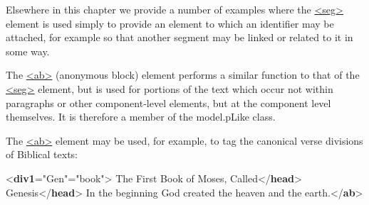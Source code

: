 Elsewhere in this chapter we provide a number of examples where the \hyperref[TEI.seg]{<seg>} element is used simply to provide an element to which an identifier may be attached, for example so that another segment may be linked or related to it in some way.\par
The \hyperref[TEI.ab]{<ab>} (anonymous block) element performs a similar function to that of the \hyperref[TEI.seg]{<seg>} element, but is used for portions of the text which occur not within paragraphs or other component-level elements, but at the component level themselves. It is therefore a member of the \textsf{model.pLike} class.\par
The \hyperref[TEI.ab]{<ab>} element may be used, for example, to tag the canonical verse divisions of Biblical texts: \par\bgroup{}\exampleFont \begin{shaded}\noindent\mbox{}{<\textbf{div1}\hspace*{1em}{n}="{Gen}"\hspace*{1em}{type}="{book}">}\mbox{}\newline 
{}The First Book of Moses, Called{</\textbf{head}>}\mbox{}\newline 
{}Genesis{</\textbf{head}>}\mbox{}\newline 
{}\mbox{}\newline 
\hspace*{1em}In the beginning God created the heaven and the\mbox{}\newline 
\hspace*{1em}\hspace*{1em}\hspace*{1em}\hspace*{1em} earth.{</\textbf{ab}>}\mbox{}\newline 

\end{shaded}
